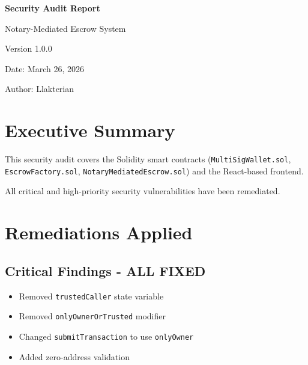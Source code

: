 \documentclass[12pt,a4paper]{article}
\begin{document}
\begin{titlepage}
\begin{center}
\vspace*{2in}
{\Huge\bfseries Security Audit Report\par}
\vspace{1in}
{\Large Notary-Mediated Escrow System\par}
\vspace{0.5in}
{\Large Version 1.0.0\par}
\vspace{2in}
{\large Date: March 26, 2026\par}
\vspace{0.5in}
{\large Author: Llakterian\par}
\end{center}
\end{titlepage}

\newpage

\section{Executive Summary}
This security audit covers the Solidity smart contracts (\texttt{MultiSigWallet.sol}, \texttt{EscrowFactory.sol}, \texttt{NotaryMediatedEscrow.sol}) and the React-based frontend.

\vspace{0.2in}
\noindent{}

All critical and high-priority security vulnerabilities have been remediated.

\section{Remediations Applied}

\subsection{Critical Findings - ALL FIXED}

\noindent{}
\begin{itemize}
\item Removed \texttt{trustedCaller} state variable
\item Removed \texttt{onlyOwnerOrTrusted} modifier
\item Changed \texttt{submitTransaction} to use \texttt{onlyOwner}
\item Added zero-address validation
\end{itemize}
\end{document}
